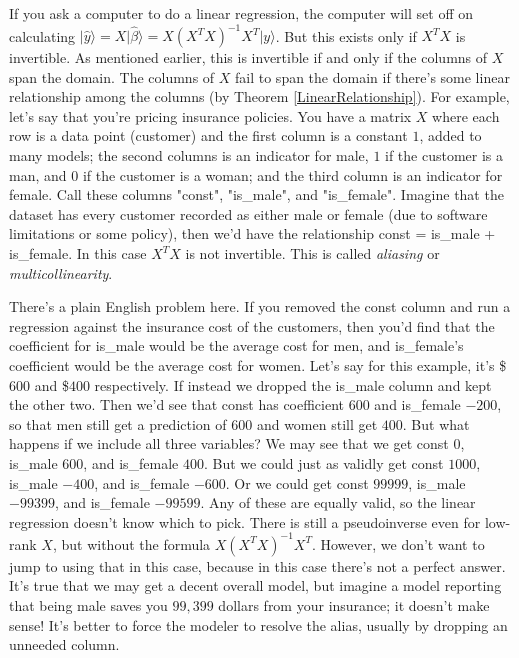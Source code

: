 \documentclass{amsbook}
\begin{document}
If you ask a computer to do a linear regression, the computer will set off on calculating $|\hat y\rangle=X|\hat\beta\rangle=X\left(X^TX\right)^{-1}X^T|y\rangle$.  But this exists only if $X^TX$ is invertible.  As mentioned earlier, this is invertible if and only if the columns of $X$ span the domain.  The columns of $X$ fail to span the domain if there's some linear relationship among the columns (by Theorem \ref{LinearRelationship}).  For example, let's say that you're pricing insurance policies.  You have a matrix $X$ where each row is a data point (customer) and the first column is a constant $1$, added to many models; the second columns is an indicator for male, $1$ if the customer is a man, and $0$ if the customer is a woman; and the third column is an indicator for female.  Call these columns "const", "is\_male", and "is\_female".  Imagine that the dataset has every customer recorded as either male or female (due to software limitations or some policy), then we'd have the relationship const = is\_male + is\_female.  In this case $X^TX$ is not invertible.  This is called {\em aliasing} or {\em multicollinearity}.

There's a plain English problem here.  If you removed the const column and run a regression against the insurance cost of the customers, then you'd find that the coefficient for is\_male would be the average cost for men, and is\_female's coefficient would be the average cost for women.  Let's say for this example, it's \$$600$ and \$$400$ respectively.  If instead we dropped the is\_male column and kept the other two.  Then we'd see that const has coefficient $600$ and is\_female $-200$, so that men still get a prediction of $600$ and women still get $400$.  But what happens if we include all three variables?  We may see that we get const $0$, is\_male $600$, and is\_female $400$.  But we could just as validly get const $1000$, is\_male $-400$, and is\_female $-600$.  Or we could get const $99999$, is\_male $-99399$, and is\_female $-99599$.  Any of these are equally valid, so the linear regression doesn't know which to pick.  There is still a pseudoinverse even for low-rank $X$, but without the formula $X\left(X^TX\right)^{-1}X^T$.  However, we don't want to jump to using that in this case, because in this case there's not a perfect answer.  It's true that we may get a decent overall model, but imagine a model reporting that being male saves you $99,399$ dollars from your insurance; it doesn't make sense!  It's better to force the modeler to resolve the alias, usually by dropping an unneeded column.
\end{document}
